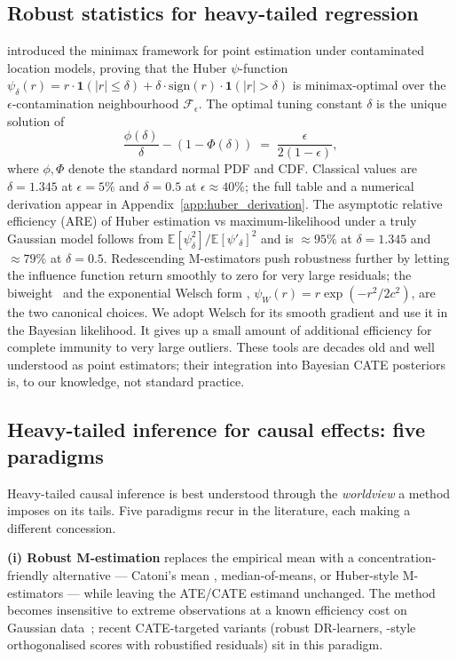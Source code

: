 \subsection{Robust statistics for heavy-tailed regression}
\label{sec:related:robust}
\citet{huber1964robust} introduced the minimax framework for
point estimation under contaminated location models, proving that
the Huber $\psi$-function $\psi_\delta(r) = r \cdot
\mathbf{1}(|r| \le \delta) + \delta \cdot \mathrm{sign}(r) \cdot
\mathbf{1}(|r| > \delta)$ is minimax-optimal over the
$\epsilon$-contamination neighbourhood $\mathcal{F}_\epsilon$. The
optimal tuning constant $\delta$ is the unique solution of
\begin{equation}
  \frac{\phi(\delta)}{\delta} - (1 - \Phi(\delta))
  \;=\; \frac{\epsilon}{2(1 - \epsilon)},
  \label{eq:huber_minimax}
\end{equation}
where $\phi, \Phi$ denote the standard normal PDF and CDF. Classical
values are $\delta = 1.345$ at $\epsilon = 5\%$ and $\delta = 0.5$
at $\epsilon \approx 40\%$; the full table and a numerical
derivation appear in Appendix~\ref{app:huber_derivation}. The
asymptotic relative efficiency (ARE) of Huber estimation vs
maximum-likelihood under a truly Gaussian model follows from
$\mathbb{E}[\psi_\delta^2] / \mathbb{E}[\psi'_\delta]^2$ and is $\approx 95\%$ at
$\delta = 1.345$ and $\approx 79\%$ at $\delta = 0.5$. Redescending
M-estimators push robustness further by letting the influence
function return smoothly to zero for very large residuals; the
biweight~\citep{beaton1974fitting} and the exponential Welsch form
\citep{dennis1978techniques}, $\psi_W(r) = r \exp(-r^2 / 2c^2)$,
are the two canonical choices. We adopt Welsch for its smooth
gradient and use it in the Bayesian likelihood. It gives up a
small amount of additional efficiency for complete immunity to very
large outliers. These tools are
decades old and well understood as point estimators; their
integration into Bayesian CATE posteriors is, to our knowledge,
not standard practice.

\subsection{Heavy-tailed inference for causal effects: five paradigms}
\label{sec:related:tails}
Heavy-tailed causal inference is best understood through the
\emph{worldview} a method imposes on its tails. Five paradigms
recur in the literature, each making a different concession.

\textbf{(i) Robust M-estimation} replaces the empirical mean with
a concentration-friendly alternative --- Catoni's mean
\citep{catoni2012challenging}, median-of-means, or Huber-style
M-estimators --- while leaving the ATE/CATE estimand unchanged.
The method becomes insensitive to extreme observations at a
known efficiency cost on Gaussian data~\citep{huber2009robust};
recent CATE-targeted variants (robust DR-learners,
\citet{chernozhukov2018double}-style orthogonalised scores with
robustified residuals) sit in this paradigm.

